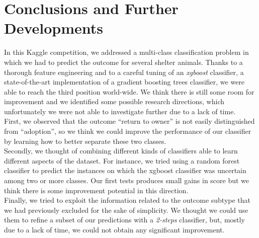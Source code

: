 \documentclass[a4paper,11pt]{article}
\begin{document}
\section{Conclusions and Further Developments}
In this Kaggle competition, we addressed a multi-class classification problem in which we had to predict the outcome for several shelter animals. Thanks to a thorough feature engineering and to a careful tuning of an \emph{xgboost} classifier, a state-of-the-art implementation of a gradient boosting trees classifier, we were able to reach the third position world-wide. We think there is still some room for improvement and we identified some possible research directions, which unfortunately we were not able to investigate further due to a lack of time.\\
First, we observed that the outcome ``return to owner'' is not easily distinguished from ``adoption'', so we think we could improve the performance of our classifier by learning how to better separate these two classes. \\
Secondly, we thought of combining different kinds of classifiers able to learn different aspects of the dataset. For instance, we tried using a random forest classifier to predict the instances on which the xgboost classifier was uncertain among two or more classes. Our first tests produces small gains in score but we think there is some improvement potential in this direction.\\
Finally, we tried to exploit the information related to the outcome subtype that we had previously excluded for the sake of simplicity. We thought we could use them to refine a subset of our predictions with a \emph{2-steps} classifier, but, mostly due to a lack of time, we could not obtain any significant improvement.\\

\nocite{*}




	
\end{document}
